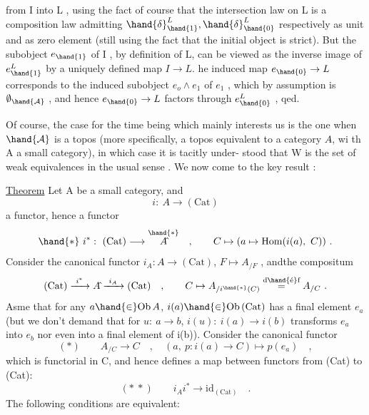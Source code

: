 from I into L ,  using the fact of course that the intersection law on L
 is a composition law admitting $\hand{\delta}^{L}_{\hand{1}} ,\hand{\delta}^{L}_{\hand{0}}$ respectively as unit and
as zero element (still using the fact that the initial object is strict).
 But the subobject $e_{\hand{1}}$ of I ,  by definition of L,  can be viewed as the
 inverse image of $e^{L}_{\hand{1}}$ by a uniquely defined map $I \to L$.  he induced
 map $e_{\hand{0}} \to L$ corresponds to the induced subobject $e_{o}\wedge e_{1}$ of $e_{1}$ ,
which by assumption is $\emptyset_{\hand{\mathcal{A}}}$ ,  and hence $e_{\hand{0}} \to L$ factors through $e^{L}_{\hand{0}}$ ,  qed.

Of course,  the case for the time being which mainly interests us is
the one when $\hand{\mathcal{A}}$ is a topos (more specifically, a topos equivalent to a
category $A\hat{}$, wi th A a small category),  in which case it is tacitly under-%
stood that W is the set of weak equivalences in the usual sense .  We now
come to the key result :

\uline{Theorem}  Let A be a small category,  and
\[ i:\ A \longrightarrow (\mathrm{Cat}) \]
a functor,  hence a functor
\[ \hand{*}\ i^{*} :\ (\mathrm{Cat}) \longrightarrow \overset{\hand{*}}{A\hat{}} \quad ,\qquad C \mapsto (a \mapsto \mathrm{Hom}(i(a),\ C)) \ . \]
Consider the canonical functor  $i_{A} : A\hat{} \to (\mathrm{Cat})$,  $F \mapsto A_{/F}$ ,  and\hand{/}the
compositum
\[ (\mathrm{Cat}) \xrightarrow{\ i^{*}\ } A\hat{} \xrightarrow{\ i_{A}\ } (\mathrm{Cat}) \quad ,\qquad C \mapsto A_{/i^{\hand{*}}(C)} \overset{\text{d\hand{\'e}f}}{=} A_{/C} \ . \]
Asme that for any $a \hand{\in} \mathrm{Ob}\, A$,  $i(a) \hand{\in} \mathrm{Ob}\, (\mathrm{Cat})$ has a final element $e_{a}$ (but
we don't demand that for $u:\ a \to b$,  $i(u):\ i(a) \to i(b)$ transforms $e_{a}$ into
$e_{b}$ nor even into a final element of i(b)).  Consider the canonical
functor
\[ (*) \qquad A_{/C} \longrightarrow C \quad , \quad (a,\ p{:}i(a) \to C) \longmapsto p(e_{a}) \quad , \]
which is functorial in C,  and hence defines a map between functors from
(Cat) to (Cat):
\[ (*\ *) \qquad i_{A}i^{*} \longrightarrow \mathrm{id}_{(\mathrm{Cat})} \quad . \]
The following conditions  are equivalent:

